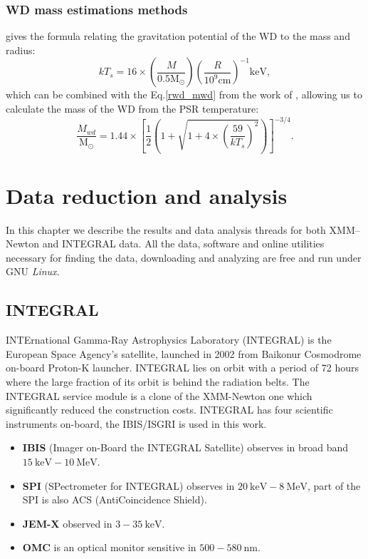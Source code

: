 \documentclass[oneside,a4paper,11pt]{report}
\begin{document}
\subsection{WD mass estimations methods}
\citet{1973PThPh..49.1184A_aizu} gives the formula relating the gravitation potential of the WD to the mass and radius:
\begin{equation}
 \label{aizu1}
kT_s = 16 \times \left( \frac{M}{0.5\mathrm{M_{\odot}}}\right)\left( \frac{R}{10^9 \mathrm{cm}}\right)^{-1} \mathrm{keV},
\end{equation}
which can be combined with the Eq.\eqref{rwd_mwd} from the work of \citet{1972ApJ...175..417N}, allowing
us to calculate the mass of the WD from the PSR temperature:   
\begin{equation}
 \label{MWD:1}
\frac{M_{wd}}{\mathrm{M_{\odot}}} = 1.44\times \left[\frac{1}{2} \left( 1+ \sqrt{1+4\times\left(\frac{59}{kT_s}\right)^2} \right) \right]^{-3/4}.
\end{equation}



\chapter{Data reduction and analysis}
In this chapter we describe the results and data analysis threads for both XMM--Newton and INTEGRAL data. 
All the data, software and online utilities necessary for finding the data, downloading and analyzing are free 
and run under GNU \textit{Linux}.  

\section{INTEGRAL}
INTErnational Gamma-Ray Astrophysics Laboratory (INTEGRAL) is the European Space Agency's satellite, 
launched in 2002 from Baikonur Cosmodrome on-board Proton-K launcher. INTEGRAL lies on orbit with a  
period of 72 hours where the large fraction of its orbit is behind the radiation belts. The INTEGRAL service 
module is a clone of the XMM-Newton one which significantly reduced the construction costs. 
INTEGRAL has four scientific instruments on-board, the IBIS/ISGRI is used in this work. 
\begin{itemize}
 \item \textbf{IBIS} (Imager on-Board the INTEGRAL Satellite) observes in broad band $15\:\mathrm{keV} -
10\:\mathrm{MeV}$.
\item \textbf{SPI} (SPectrometer for INTEGRAL) observes in $20\:\mathrm{keV}-8\:\mathrm{MeV}$, part of the SPI is
also ACS (AntiCoincidence Shield).
\item \textbf{JEM-X} observed in $3 - 35\:\mathrm{keV}$.
\item \textbf{OMC} is an optical monitor sensitive in $500-580\:\mathrm{nm}$.
\end{itemize}
\end{document}
